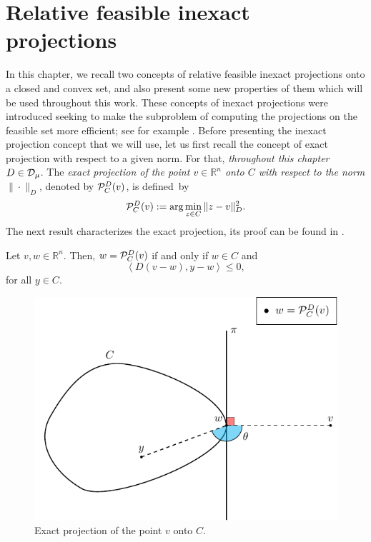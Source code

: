 \chapter{Relative feasible inexact projections} \label{chap:SubInexProj}


In this chapter, we recall two concepts  of relative feasible inexact projections onto a closed and convex set, and  also  present  some  new properties of them which will be used throughout this work. These  concepts  of inexact projections were    introduced seeking to make the subproblem of computing the projections on the feasible  set more efficient;  see for example \cite{BirginMartinezRaydan2003,SalzoVilla2012,VillaSalzo2013}. Before presenting the  inexact projection concept that we will use, let us first recall the concept of exact projection with respect to a given  norm.  For that, {\it throughout this chapter  $D\in {\cal D}_{\mu}$}. The {\it exact  projection of the point $v\in \mathbb{R}^{n}$ onto $C$ with respect to the norm $\| \cdot \| _{D}$}, denoted by  ${\cal P}_{C}^{D}(v)$, is  defined~by
\begin{equation}\label{eq:exactM}
	{\cal P}_{C}^{D}(v):=\arg \min _{z\in C}\|z-v\|^2_{D}.
\end{equation}
The next result  characterizes  the exact projection, its  proof can be found in  \cite[Theorem 3.14]{BauschkeLivro2014}.

\begin{lemma} \label{pr:cham}
	Let $v, w \in {\mathbb R}^n$.  Then,  $w={\cal P}_{C}^{D}(v)$ if and only if  $w\in C$ and
	$$\left\langle D(v-w), y-w\right\rangle \leq  0,$$
	for all $y \in C.$
\end{lemma}


\begin{figure}[H]
	\centering
	\includegraphics{figures/exactProj.pdf}
	\caption{Exact projection of the point $v$ onto $C$.}
\end{figure}


